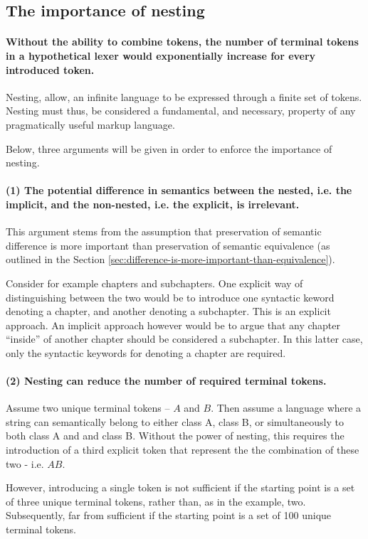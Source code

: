 \documentclass{scrreprt}
\begin{document}
\subsection{The importance of nesting}
\paragraph{Without the ability to combine tokens, the number of terminal tokens in a hypothetical lexer would exponentially increase for every introduced token.} Nesting, allow, an infinite language to be expressed through a finite set of tokens. Nesting must thus, be considered a fundamental, and necessary, property of any pragmatically useful markup language.

Below, three arguments will be given in order to enforce the importance of nesting.


\paragraph{(1) The potential difference in semantics between the nested, i.e. the implicit, and the non-nested, i.e. the explicit, is irrelevant.}
This argument stems from the assumption that preservation of semantic difference is more important than preservation of semantic equivalence (as outlined in the Section \ref{sec:difference-is-more-important-than-equivalence}).

Consider for example chapters and subchapters. One explicit way of distinguishing between the two would be to introduce one syntactic keword denoting a chapter, and another denoting a subchapter. This is an explicit approach. An implicit approach however would be to argue that any chapter ``inside'' of another chapter should be considered a subchapter. In this latter case, only the syntactic keywords for denoting a chapter are required.


\paragraph{(2) Nesting can reduce the number of required terminal tokens.}
Assume two unique terminal tokens -- $A$ and $B$. Then assume a language where a string can semantically belong to either class A, class B, or simultaneously to both class A and and class B. Without the power of nesting, this requires the introduction of a third explicit token that represent the the combination of these two - i.e. $AB$.

However, introducing a single token is not sufficient if the starting point is a set of three unique terminal tokens, rather than, as in the example, two. Subsequently, far from sufficient if the starting point is a set of 100 unique terminal tokens.
\end{document}
